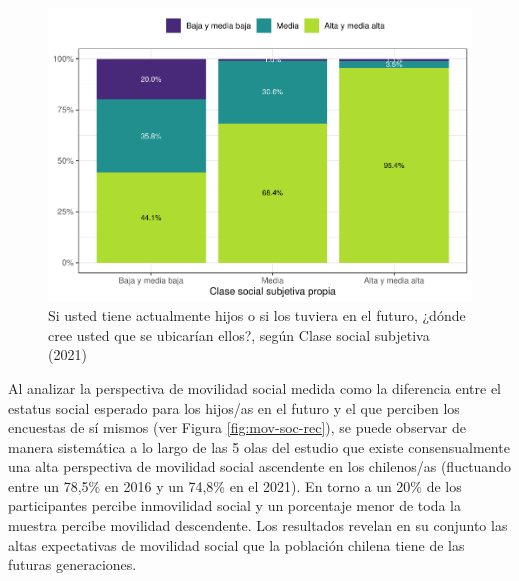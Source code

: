 \documentclass[
  12pt,
]{book}
\begin{document}
\begin{figure}

{\centering \includegraphics{reporte-elsoc_files/figure-latex/esshijos-ess-1} 

}

\caption{Si usted tiene actualmente hijos o si los tuviera en el futuro, ¿dónde cree usted que se ubicarían ellos?, según Clase social subjetiva (2021)}\label{fig:esshijos-ess}
\end{figure}

Al analizar la perspectiva de movilidad social medida como la diferencia entre el estatus social esperado para los hijos/as en el futuro y el que perciben los encuestas de sí mismos (ver Figura \ref{fig:mov-soc-rec}), se puede observar de manera sistemática a lo largo de las 5 olas del estudio que existe consensualmente una alta perspectiva de movilidad social ascendente en los chilenos/as (fluctuando entre un 78,5\% en 2016 y un 74,8\% en el 2021). En torno a un 20\% de los participantes percibe inmovilidad social y un porcentaje menor de toda la muestra percibe movilidad descendente. Los resultados revelan en su conjunto las altas expectativas de movilidad social que la población chilena tiene de las futuras generaciones.
\end{document}
